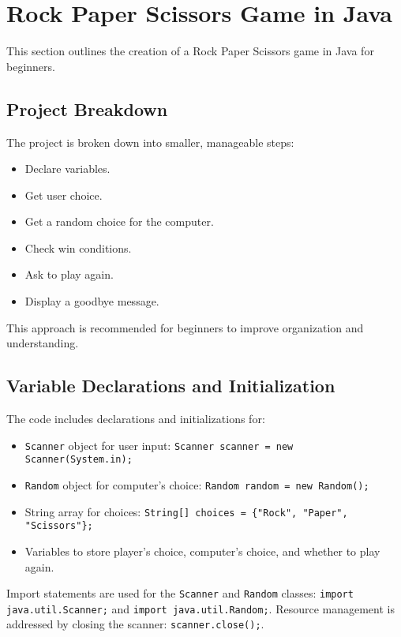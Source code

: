 \documentclass{article}
\begin{document}
\section{Rock Paper Scissors Game in Java}

This section outlines the creation of a Rock Paper Scissors game in Java for beginners.


\subsection{Project Breakdown}

The project is broken down into smaller, manageable steps:

\begin{itemize}
    \item Declare variables.
    \item Get user choice.
    \item Get a random choice for the computer.
    \item Check win conditions.
    \item Ask to play again.
    \item Display a goodbye message.
\end{itemize}

This approach is recommended for beginners to improve organization and understanding.


\subsection{Variable Declarations and Initialization}

The code includes declarations and initializations for:

\begin{itemize}
    \item \texttt{Scanner} object for user input: \texttt{Scanner scanner = new Scanner(System.in);}
    \item \texttt{Random} object for computer's choice: \texttt{Random random = new Random();}
    \item String array for choices: \texttt{String[] choices = \{"Rock", "Paper", "Scissors"\};}
    \item Variables to store player's choice, computer's choice, and whether to play again.
\end{itemize}

Import statements are used for the \texttt{Scanner} and \texttt{Random} classes:  \texttt{import java.util.Scanner;} and \texttt{import java.util.Random;}.  Resource management is addressed by closing the scanner: \texttt{scanner.close();}.
\end{document}
